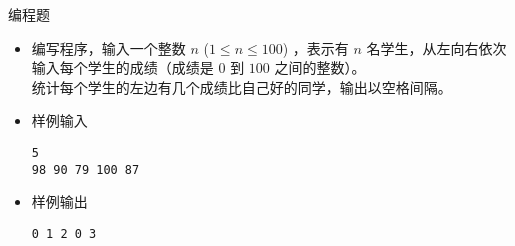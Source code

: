 \begin{frame}[fragile]
{{\begin{itemize}
            \end{itemize}
        }{
            \begin{exampleblock}{编程题}

                \begin{itemize}
                    \item 编写程序，输入一个整数 $n$ ($1 \le n \le 100$) ，表示有 $n$ 名学生，从左向右依次输入每个学生的成绩（成绩是 $0$ 到 $100$ 之间的整数）。\\
                        统计每个学生的左边有几个成绩比自己好的同学，输出以空格间隔。

                    \item 样例输入

                        \lstinline|5|\\
                        \lstinline|98 90 79 100 87|

                    \item 样例输出

                        \lstinline|0 1 2 0 3|

                \end{itemize}

            \end{exampleblock}
        }
    }
\end{frame}

